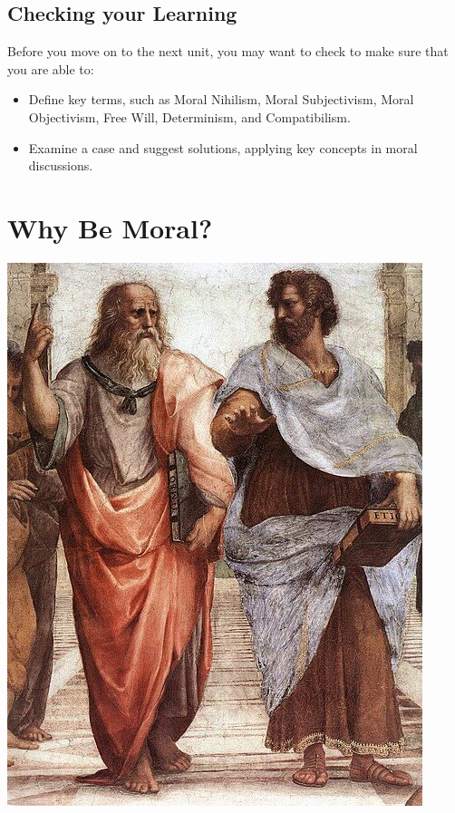 \documentclass[
]{book}
\providecommand{\tightlist}{%
  \setlength{\itemsep}{0pt}\setlength{\parskip}{0pt}}
\begin{document}
\hypertarget{checking-your-learning-1}{%
\section*{Checking your Learning}\label{checking-your-learning-1}}

\begin{progress}
Before you move on to the next unit, you may want to check to make sure that you are able to:

\begin{itemize}
\tightlist
\item
  Define key terms, such as Moral Nihilism, Moral Subjectivism, Moral Objectivism, Free Will, Determinism, and Compatibilism.\\
\item
  Examine a case and suggest solutions, applying key concepts in moral discussions.
\end{itemize}
\end{progress}

\hypertarget{why-be-moral}{%
\chapter{Why Be Moral?}\label{why-be-moral}}

\includegraphics{assets/unit_3/U3_458px-Sanzio_01_Plato_Aristotle.jpg}
\end{document}
